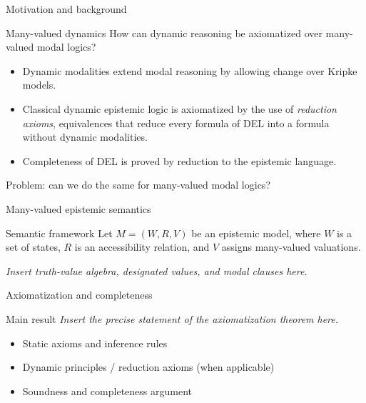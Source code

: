 \documentclass[aspectratio=169,11pt]{beamer}
\begin{document}
\begin{frame}{Motivation and background}
\begin{block}{Many-valued dynamics}
How can dynamic reasoning be axiomatized over many-valued modal logics?
\end{block}
\vspace{0.4cm}
\begin{itemize}
\item Dynamic modalities extend modal reasoning by allowing change over Kripke models. 
\item Classical dynamic epistemic logic is axiomatized by the use of \textit{reduction axioms}, equivalences that reduce every formula of DEL into a formula without dynamic modalities.
\item Completeness of DEL is proved by reduction to the epistemic language. 

\end{itemize}
Problem: can we do the same for many-valued modal logics?
\end{frame}

\begin{frame}{Many-valued epistemic semantics}
\begin{block}{Semantic framework}
Let $M=(W,R,V)$ be an epistemic model, where $W$ is a set of states,
$R$ is an accessibility relation, and $V$ assigns many-valued valuations.
\end{block}
\vspace{0.5cm}
\centering\color{ANPOFgrey}\emph{Insert truth-value algebra, designated values, and modal clauses here.}
\end{frame}

\begin{frame}{Axiomatization and completeness}
\begin{block}{Main result}
\emph{Insert the precise statement of the axiomatization theorem here.}
\end{block}
\vspace{0.35cm}
\begin{itemize}
 \item Static axioms and inference rules
 \item Dynamic principles / reduction axioms (when applicable)
 \item Soundness and completeness argument
\end{itemize}
\end{frame}
\end{document}
